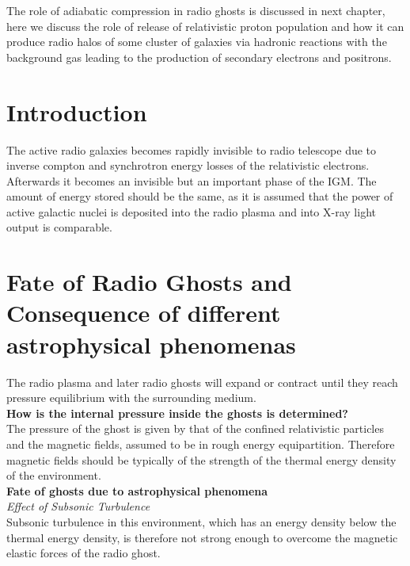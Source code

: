 \documentclass[11pt]{report}
\newcommand{\tbf}[1]{\textbf{#1}}
\newcommand{\tit}[1]{\textit{#1}}
\begin{document}
  The role of adiabatic compression in radio ghosts is discussed in next chapter, here we discuss the role of release of relativistic proton population and how it can produce radio halos of some cluster of galaxies via hadronic reactions with the background gas leading to the production of secondary electrons and positrons.\\
  
  \section{Introduction}
  The active radio galaxies becomes rapidly invisible to radio telescope due to inverse compton and synchrotron energy  losses of the relativistic electrons. Afterwards it becomes an invisible but an important phase of the IGM. The amount of energy stored should be the same, as it is assumed that the power of active galactic nuclei is deposited into the radio plasma and into X-ray light output is comparable.\\
  
  \section{Fate of Radio Ghosts and Consequence of different astrophysical phenomenas}
  
  The radio plasma and later radio ghosts will expand or contract until they reach pressure equilibrium with the surrounding medium.\\
  
  \tbf{How is the internal pressure inside the ghosts is determined?}\\
  
   The pressure of the ghost is given by that of the confined relativistic particles and the magnetic fields, assumed to be in rough energy equipartition. Therefore magnetic fields should be typically of the strength of the thermal energy density of the environment.\\
   
\tbf{Fate of ghosts due to astrophysical phenomena}\\

\tit{Effect of Subsonic Turbulence}\\
   
    Subsonic turbulence in this environment, which has an energy density below the thermal energy density, is therefore not strong enough to overcome the magnetic elastic forces of the radio ghost. \\
    
\end{document}
